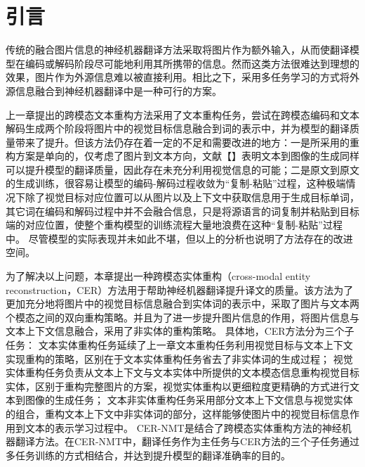 \section{引言}
传统的融合图片信息的神经机器翻译方法采取将图片作为额外输入，从而使翻译模型在编码或解码阶段尽可能地利用其所携带的信息。然而这类方法很难达到理想的效果，图片作为外源信息难以被直接利用。相比之下，采用多任务学习的方式将外源信息融合到神经机器翻译中是一种可行的方案\cite{49_wang-zhang-2022-addressing,50_kang_zong_2022}。


上一章提出的跨模态文本重构方法采用了文本重构任务，尝试在跨模态编码和文本解码生成两个阶段将图片中的视觉目标信息融合到词的表示中，并为模型的翻译质量带来了提升。但该方法仍存在着一定的不足和需要改进的地方：一是所采用的重构方案是单向的，仅考虑了图片到文本方向，文献【】表明文本到图像的生成同样可以提升模型的翻译质量，因此存在未充分利用视觉信息的可能；二是原文到原文的生成训练，很容易让模型的编码-解码过程收敛为“复制-粘贴”过程，这种极端情况下除了视觉目标对应位置可以从图片以及上下文中获取信息用于生成目标单词，其它词在编码和解码过程中并不会融合信息，只是将源语言的词复制并粘贴到目标端的对应位置，使整个重构模型的训练流程大量地浪费在这种“复制-粘贴”过程中。
尽管模型的实际表现并未如此不堪，但以上的分析也说明了方法存在的改进空间。

为了解决以上问题，本章提出一种跨模态实体重构（cross-modal entity reconstruction，CER）方法用于帮助神经机器翻译提升译文的质量。该方法为了更加充分地将图片中的视觉目标信息融合到实体词的表示中，采取了图片与文本两个模态之间的双向重构策略。并且为了进一步提升图片信息的作用，将图片信息与文本上下文信息融合，采用了非实体的重构策略。
具体地，CER方法分为三个子任务：
文本实体重构任务延续了上一章文本重构任务利用视觉目标与文本上下文实现重构的策略，区别在于文本实体重构任务省去了非实体词的生成过程；
视觉实体重构任务负责从文本上下文与文本实体中所提供的文本模态信息重构视觉目标实体，区别于重构完整图片的方案，视觉实体重构以更细粒度更精确的方式进行文本到图像的生成任务；
文本非实体重构任务采用部分文本上下文信息与视觉实体的组合，重构文本上下文中非实体词的部分，这样能够使图片中的视觉目标信息作用到文本的表示学习过程中。
CER-NMT是结合了跨模态实体重构方法的神经机器翻译方法。在CER-NMT中，翻译任务作为主任务与CER方法的三个子任务通过多任务训练的方式相结合，并达到提升模型的翻译准确率的目的。

